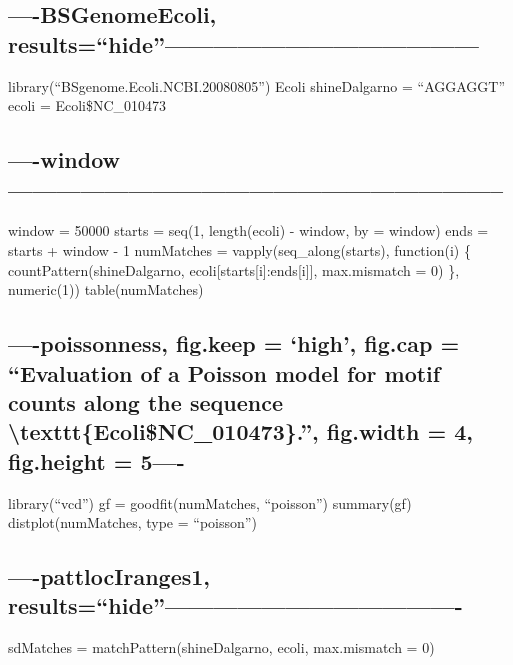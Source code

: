 \documentclass[]{article}
\begin{document}
\subsection{\texorpdfstring{----BSGenomeEcoli,
results=``hide''---------------------------------------}{----BSGenomeEcoli, results=hide---------------------------------------}}\label{bsgenomeecoli-resultshide}

library(``BSgenome.Ecoli.NCBI.20080805'') Ecoli shineDalgarno =
``AGGAGGT'' ecoli = Ecoli\$NC\_010473

\subsection{----window--------------------------------------------------------------}\label{window}

window = 50000 starts = seq(1, length(ecoli) - window, by = window) ends
= starts + window - 1 numMatches = vapply(seq\_along(starts),
function(i) \{ countPattern(shineDalgarno,
ecoli{[}starts{[}i{]}:ends{[}i{]}{]}, max.mismatch = 0) \}, numeric(1))
table(numMatches)

\subsection{\texorpdfstring{----poissonness, fig.keep = `high', fig.cap
= ``Evaluation of a Poisson model for motif counts along the sequence
\textbackslash{}texttt\{Ecoli\$NC\_010473\}.'', fig.width = 4,
fig.height =
5----}{----poissonness, fig.keep = high, fig.cap = Evaluation of a Poisson model for motif counts along the sequence \textbackslash{}texttt\{Ecoli\$NC\_010473\}., fig.width = 4, fig.height = 5----}}\label{poissonness-fig.keep-high-fig.cap-evaluation-of-a-poisson-model-for-motif-counts-along-the-sequence-textttecolinc_010473.-fig.width-4-fig.height-5-}

library(``vcd'') gf = goodfit(numMatches, ``poisson'') summary(gf)
distplot(numMatches, type = ``poisson'')

\subsection{\texorpdfstring{----pattlocIranges1,
results=``hide''-------------------------------------}{----pattlocIranges1, results=hide-------------------------------------}}\label{pattlociranges1-resultshide-}

sdMatches = matchPattern(shineDalgarno, ecoli, max.mismatch = 0)
\end{document}
